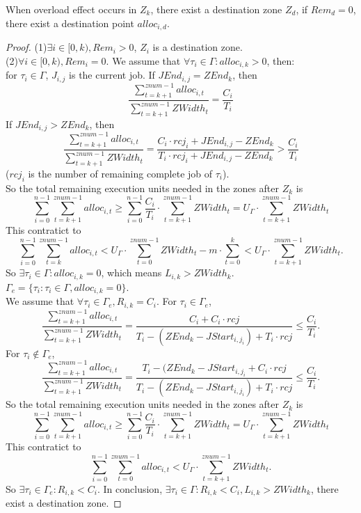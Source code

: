 \documentclass{article}
\begin{document}
\begin{lemm}
	When overload effect occurs in $Z_k$, there exist a destination zone $Z_d$, if $Rem_d=0$, there exist a destination point $alloc_{i,d}$.
\end{lemm}

\begin{proof}
	(1)$\exists i \in [0,k), Rem_i>0$, $Z_i$ is a destination zone. \\
	(2)$\forall i \in [0,k), Rem_i=0$. We assume that $\forall \tau_i \in \Gamma : alloc_{i,k}>0$, then: \\
		for $\tau_i \in \Gamma$, $J_{i,j}$ is the current job. If $JEnd_{i,j} = ZEnd_k$, then
		\[
			\dfrac{\sum\limits_{t=k+1}^{znum-1} alloc_{i,t}}{\sum\limits_{t=k+1}^{znum-1} ZWidth_t} 
			= \dfrac{C_i}{T_i}
		\]
		If $JEnd_{i,j}>ZEnd_k$, then
		\[
			\dfrac{\sum\limits_{t=k+1}^{znum-1} alloc_{i,t}}{\sum\limits_{t=k+1}^{znum-1} ZWidth_t}
			= \dfrac{C_i \cdot rcj_i + JEnd_{i,j} - ZEnd_k}{T_i \cdot rcj_i + JEnd_{i,j} - ZEnd_k}
			> \dfrac{C_i}{T_i}
		\]
		($rcj_i$ is the number of remaining complete job of $\tau_i$).\\
		So the total remaining execution units needed in the zones after $Z_k$ is 
		\[
			\sum\limits_{i=0}^{n-1} \sum\limits_{t=k+1}^{znum-1} alloc_{i,t} \geq 
			\sum\limits_{i=0}^{n-1} \dfrac{C_i}{T_i} \cdot \sum\limits_{t=k+1}^{znum-1} ZWidth_t =
			U_\Gamma \cdot \sum\limits_{t=k+1}^{znum-1} ZWidth_t
		\]
		This contratict to 
		\[
			\sum\limits_{i=0}^{n-1} \sum\limits_{t=k}^{znum-1} alloc_{i,t} <
			U_\Gamma \cdot \sum\limits_{t=0}^{znum-1} ZWidth_t - m \cdot \sum\limits_{t=0}^{k} < U_\Gamma \cdot \sum\limits_{t=k+1}^{znum-1} ZWidth_t.
		\]
		So $\exists \tau_i \in \Gamma : alloc_{i,k} = 0$, which means $L_{i,k} > ZWidth_k$.
		$\Gamma_e = \{ \tau_i : \tau_i \in \Gamma , alloc_{i,k}=0 \}$. \\

		We assume that $\forall \tau_i \in \Gamma_e, R_{i,k} = C_i$.
		For $\tau_i \in \Gamma_e$, 
		\[
			\dfrac{\sum\limits_{t=k+1}^{znum-1} alloc_{i,t}}{\sum\limits_{t=k+1}^{znum-1} ZWidth_t} =
			\dfrac{C_i + C_i \cdot rcj}{T_i-(ZEnd_k-JStart_{i,j_i}) + T_i \cdot rcj} \leq
			\dfrac{C_i}{T_i} .
		\]
		For $\tau_i \notin \Gamma_e$,
		\[
			\dfrac{\sum\limits_{t=k+1}^{znum-1} alloc_{i,t}}{\sum\limits_{t=k+1}^{znum-1} ZWidth_t} =
			\dfrac{T_i - (ZEnd_k-JStart_{i,j_i} + C_i \cdot rcj}{T_i-(ZEnd_k-JStart_{i,j_i}) + T_i \cdot rcj} \leq
			\dfrac{C_i}{T_i} .
		\]
		So the total remaining execution units needed in the zones after $Z_k$ is
		\[
			\sum\limits_{i=0}^{n-1} \sum\limits_{t=k+1}^{znum-1} alloc_{i,t} \geq 
			\sum\limits_{i=0}^{n-1} \dfrac{C_i}{T_i} \cdot \sum\limits_{t=k+1}^{znum-1} ZWidth_t =
			U_\Gamma \cdot \sum\limits_{t=k+1}^{znum-1} ZWidth_t
		\]
		This contratict to 
		\[
			\sum\limits_{i=0}^{n-1} \sum\limits_{t=0}^{znum-1} alloc_{i,t} < U_\Gamma \cdot \sum\limits_{t=k+1}^{znum-1} ZWidth_t.
		\]
		So $\exists \tau_i \in \Gamma_e : R_{i,k} < C_i$.
		In conclusion, $\exists \tau_i \in \Gamma : R_{i,k} < C_i, L_{i,k} > ZWidth_k$, there exist a destination zone.
\end{proof}
\end{document}
